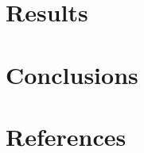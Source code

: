 \documentclass[
  a4paper,
]{scrreprt}
\begin{document}
\chapter{Results}\label{results}


\chapter{Conclusions}\label{conclusions}


\chapter*{References}\label{references}

\end{document}
